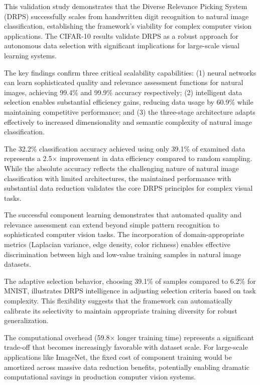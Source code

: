 \documentclass[12pt]{article}
\begin{document}
This validation study demonstrates that the Diverse Relevance Picking System (DRPS) successfully scales from handwritten digit recognition to natural image classification, establishing the framework's viability for complex computer vision applications. The CIFAR-10 results validate DRPS as a robust approach for autonomous data selection with significant implications for large-scale visual learning systems.

The key findings confirm three critical scalability capabilities: (1) neural networks can learn sophisticated quality and relevance assessment functions for natural images, achieving 99.4\% and 99.9\% accuracy respectively; (2) intelligent data selection enables substantial efficiency gains, reducing data usage by 60.9\% while maintaining competitive performance; and (3) the three-stage architecture adapts effectively to increased dimensionality and semantic complexity of natural image classification.

The 32.2\% classification accuracy achieved using only 39.1\% of examined data represents a 2.5× improvement in data efficiency compared to random sampling. While the absolute accuracy reflects the challenging nature of natural image classification with limited architectures, the maintained performance with substantial data reduction validates the core DRPS principles for complex visual tasks.

The successful component learning demonstrates that automated quality and relevance assessment can extend beyond simple pattern recognition to sophisticated computer vision tasks. The incorporation of domain-appropriate metrics (Laplacian variance, edge density, color richness) enables effective discrimination between high and low-value training samples in natural image datasets.

The adaptive selection behavior, choosing 39.1\% of samples compared to 6.2\% for MNIST, illustrates DRPS intelligence in adjusting selection criteria based on task complexity. This flexibility suggests that the framework can automatically calibrate its selectivity to maintain appropriate training diversity for robust generalization.

The computational overhead (59.8× longer training time) represents a significant trade-off that becomes increasingly favorable with dataset scale. For large-scale applications like ImageNet, the fixed cost of component training would be amortized across massive data reduction benefits, potentially enabling dramatic computational savings in production computer vision systems.
\end{document}

